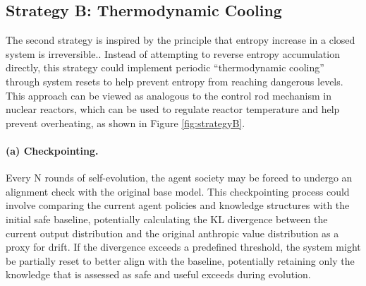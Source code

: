 \documentclass{article}
\theoremstyle{definition}
\theoremstyle{plain}
\begin{document}
\subsection{Strategy B: Thermodynamic Cooling}
The second strategy is inspired by the principle that entropy increase in a closed system is irreversible.. Instead of attempting to reverse entropy accumulation directly, this strategy could implement periodic “thermodynamic cooling” through system resets to help prevent entropy from reaching dangerous levels. This approach can be viewed as analogous to the control rod mechanism in nuclear reactors, which can be used to regulate reactor temperature and help prevent overheating, as shown in Figure \ref{fig:strategyB}. 

\paragraph{\textbf{(a) Checkpointing.}} %
Every N rounds of self-evolution, the agent society may be forced to undergo an alignment check with the original base model. This checkpointing process could involve comparing the current agent policies and knowledge structures with the initial safe baseline, potentially calculating the KL divergence between the current output distribution and the original anthropic value distribution as a proxy for drift. If the divergence exceeds a predefined threshold, the system might be partially reset to better align with the baseline, potentially retaining only the knowledge that is assessed as safe and useful exceeds during evolution. 
\end{document}
